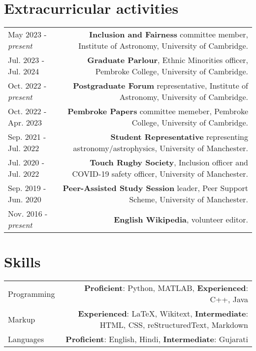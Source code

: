 \documentclass{article}
\begin{document}
\section*{Extracurricular activities}
\begin{tabular}{L!{\vrule}R}

  May 2023 - \textit{present} & \textbf{Inclusion and Fairness} committee member, Institute of Astronomy, University of Cambridge. \\

  Jul. 2023 - Jul. 2024 & \textbf{Graduate Parlour}, Ethnic Minorities officer, Pembroke College, University of Cambridge. \\

  Oct. 2022 - \textit{present} & \textbf{Postgraduate Forum} representative, Institute of Astronomy, University of Cambridge. \\

  Oct. 2022 - Apr. 2023 & \textbf{Pembroke Papers} committee memeber, Pembroke College, University of Cambridge. \\

  Sep. 2021 - Jul. 2022 & \textbf{Student Representative} representing astronomy/astrophysics, University of Manchester. \\

  Jul. 2020 - Jul. 2022 & \textbf{Touch Rugby Society}, Inclusion officer and COVID-19 safety officer, University of Manchester. \\

	Sep. 2019 - Jun. 2020 & \textbf{Peer-Assisted Study Session} leader, Peer Support Scheme, University of Manchester. \\

	Nov. 2016 - \textit{present} & \textbf{English Wikipedia}, volunteer editor. \\
\end{tabular}

\section*{Skills}

\begin{tabular}{L!{\vrule}R}
	Programming & \textbf{Proficient}: Python, MATLAB, \textbf{Experienced}: C++, Java\\
	Markup & \textbf{Experienced}: LaTeX, Wikitext, \textbf{Intermediate}:  HTML, CSS, reStructuredText, Markdown \\
	Languages & \textbf{Proficient}: English, Hindi, \textbf{Intermediate}: Gujarati
\end{tabular}
\end{document}
